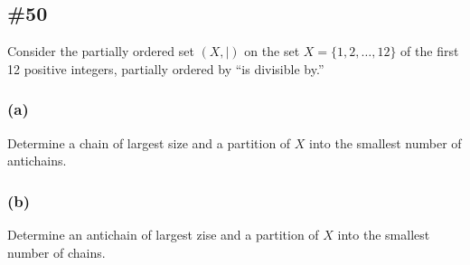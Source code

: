 \documentclass{article}
\begin{document}
\subsection*{\#50}
Consider the partially ordered set $(X,\mid)$ on the set $X=\{1,2,\dots,12\}$ of the first 12 positive integers, partially ordered by ``is divisible by.''
\subsubsection*{(a)}
Determine a chain of largest size and a partition of $X$ into the smallest number of antichains.
\subsubsection*{(b)}
Determine an antichain of largest zise and a partition of $X$ into the smallest number of chains.
\end{document}

